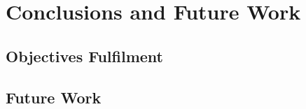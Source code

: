 \chapter{Conclusions and Future Work} \label{chap:concl}

\section*{}

\section{Objectives Fulfilment}


\section{Future Work}

